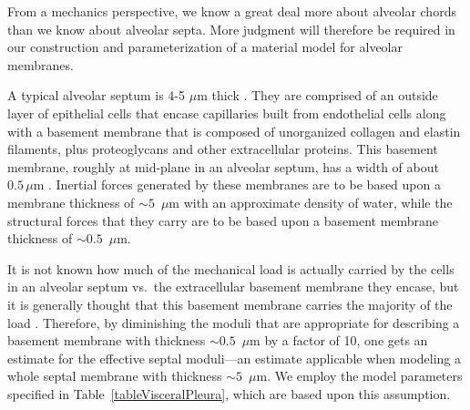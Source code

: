 From a mechanics perspective, we know a great deal more about alveolar chords than we know about alveolar septa.  More judgment will therefore be required in our construction and parameterization of a material model for alveolar membranes.  

A typical alveolar septum is 4-5 $\mu$m thick \cite{Sukietal11}.  They are comprised of an outside layer of epithelial cells that encase capillaries built from endothelial cells along with a basement membrane that is composed of unorganized collagen and elastin filaments, plus proteoglycans and other extracellular proteins.  This basement membrane, roughly at mid-plane in an alveolar septum, has a width of about $0.5 \, \mu$m \cite{RoanWaters11}.  Inertial forces generated by these membranes are to be based upon a membrane thickness of $\sim\!\!5$~$\mu$m with an approximate density of water, while the structural forces that they carry are to be based upon a basement membrane thickness of $\sim\!\! 0.5$~$\mu$m.  

It is not known how much of the mechanical load is actually carried by the cells in an alveolar septum vs.\ the extracellular basement membrane they encase, but it is generally thought that this basement membrane carries the majority of the load \cite{Sukietal11}.  Therefore, by diminishing the moduli that are appropriate for describing a basement membrane with thickness $\sim\!\! 0.5$~$\mu$m by a factor of 10, one gets an estimate for the effective septal moduli---an estimate applicable when modeling a whole septal membrane with thickness $\sim\!\! 5$~$\mu$m.  We employ the model parameters specified in Table~\ref{tableVisceralPleura}, which are based upon this assumption.

